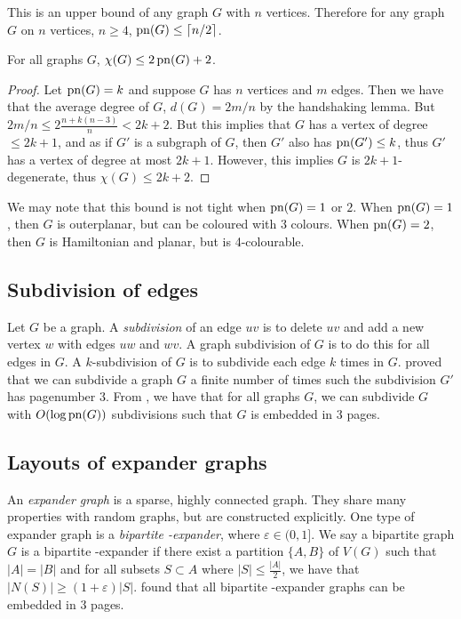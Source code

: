 This is an upper bound of any graph \(G\) with \(n\) vertices.
Therefore for any graph \(G\) on \(n\) vertices, \(n \geq 4\), \(\operatorname{pn}(G) \leq \lceil n/2 \rceil\).
\begin{theorem}\label{thm:Colouring_Bound}
	For all graphs \(G\), \(\chi(G) \leq 2 \operatorname{pn}(G) + 2\).
\end{theorem}
\begin{proof}
	Let \(\operatorname{pn}(G) = k\) and suppose \(G\) has \(n\) vertices and \(m\) edges. Then we have that the average degree of \(G\), \(d(G) = 2m/n\) by the handshaking lemma. But \(2m/n \leq 2 \frac{n + k(n-3)}{n} < 2k + 2\). But this implies that \(G\) has a vertex of degree \(\leq 2k + 1\), and as if \(G'\) is a subgraph of \(G\), then \(G'\) also has \(\operatorname{pn}(G') \leq k\), thus \(G'\) has a vertex of degree at most \(2k + 1\). However, this implies \(G\) is \(2k + 1\)-degenerate, thus \(\chi(G) \leq 2k + 2\).
\end{proof}
We may note that this bound is not tight when \(\operatorname{pn}(G) = 1\) or \(2\). When \(\operatorname{pn}(G) = 1\), then \(G\) is outerplanar, but can be coloured with 3 colours. When \(\operatorname{pn}(G) = 2\), then \(G\) is Hamiltonian and planar, but is 4-colourable.

\subsection{Subdivision of edges}
Let $G$ be a graph. A \textit{subdivision} of an edge $uv$ is to delete $uv$ and add a new vertex $w$ with edges $uw$ and $wv$. A graph subdivision of $G$ is to do this for all edges in $G$. A $k$-subdivision of $G$ is to subdivide each edge $k$ times in $G$.\textcite{atneosengailadeleEmbeddabilityCompactaNbooks} proved that we can subdivide a graph $G$ a finite number of times such the subdivision $G'$ has pagenumber 3. From \textcite{dujmovicLayoutsGraphSubdivisions2005}, we have that for all graphs $G$, we can subdivide $G$ with $O(\log\operatorname{pn}(G))$ subdivisions such that $G$ is embedded in 3 pages.

\subsection{Layouts of expander graphs}
An \textit{expander graph} is a sparse, highly connected graph. They share many properties with random graphs, but are constructed explicitly. One type of expander graph is a \textit{bipartite \varepsilon-expander}, where $\varepsilon \in (0, 1]$. We say a bipartite graph $G$ is a bipartite \varepsilon-expander if there exist a partition $ \{A, B\}$ of $V(G)$ such that $|A| = |B|$ and for all subsets $S \subset A$ where $|S| \leq \frac{|A|}{2}$, we have that $|N(S)| \geq (1 + \varepsilon) |S|$. 
\textcite{dujmovicLayoutsExpanderGraphs2016} found that all bipartite \varepsilon-expander graphs can be embedded in 3 pages. 


